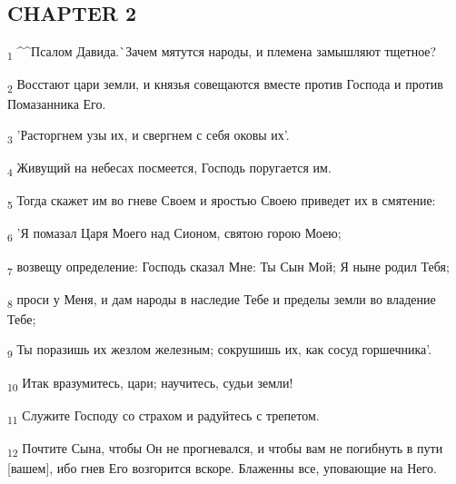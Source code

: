 \subsection{CHAPTER 2}
\begin{tcolorbox}
\textsubscript{1} ^^Псалом Давида.^^ Зачем мятутся народы, и племена замышляют тщетное?
\end{tcolorbox}
\begin{tcolorbox}
\textsubscript{2} Восстают цари земли, и князья совещаются вместе против Господа и против Помазанника Его.
\end{tcolorbox}
\begin{tcolorbox}
\textsubscript{3} 'Расторгнем узы их, и свергнем с себя оковы их'.
\end{tcolorbox}
\begin{tcolorbox}
\textsubscript{4} Живущий на небесах посмеется, Господь поругается им.
\end{tcolorbox}
\begin{tcolorbox}
\textsubscript{5} Тогда скажет им во гневе Своем и яростью Своею приведет их в смятение:
\end{tcolorbox}
\begin{tcolorbox}
\textsubscript{6} 'Я помазал Царя Моего над Сионом, святою горою Моею;
\end{tcolorbox}
\begin{tcolorbox}
\textsubscript{7} возвещу определение: Господь сказал Мне: Ты Сын Мой; Я ныне родил Тебя;
\end{tcolorbox}
\begin{tcolorbox}
\textsubscript{8} проси у Меня, и дам народы в наследие Тебе и пределы земли во владение Тебе;
\end{tcolorbox}
\begin{tcolorbox}
\textsubscript{9} Ты поразишь их жезлом железным; сокрушишь их, как сосуд горшечника'.
\end{tcolorbox}
\begin{tcolorbox}
\textsubscript{10} Итак вразумитесь, цари; научитесь, судьи земли!
\end{tcolorbox}
\begin{tcolorbox}
\textsubscript{11} Служите Господу со страхом и радуйтесь с трепетом.
\end{tcolorbox}
\begin{tcolorbox}
\textsubscript{12} Почтите Сына, чтобы Он не прогневался, и чтобы вам не погибнуть в пути [вашем], ибо гнев Его возгорится вскоре. Блаженны все, уповающие на Него.
\end{tcolorbox}
